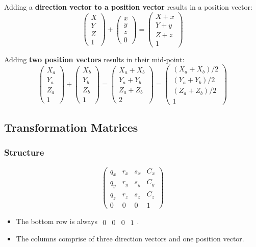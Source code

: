 \documentclass[11pt]{article}
\begin{document}
Adding a \textbf{direction vector to a position vector} results in a position vector:
\[
  \begin{pmatrix} X \\ Y \\ Z \\ 1 \end{pmatrix} 
  +
  \begin{pmatrix} x \\ y \\ z \\ 0 \end{pmatrix} 
  =
  \begin{pmatrix} X + x \\ Y + y \\ Z + z \\ 1 \end{pmatrix} 
\]

Adding \textbf{two position vectors} results in their mid-point:
\[
  \begin{pmatrix} X_a \\ Y_a \\ Z_a \\ 1 \end{pmatrix} 
  +
  \begin{pmatrix} X_b \\ Y_b \\ Z_b \\ 1 \end{pmatrix} 
  =
  \begin{pmatrix} X_a + X_b \\ Y_a + Y_b \\ Z_a + Z_b \\ 2 \end{pmatrix} 
  =
  \begin{pmatrix} (X_a + X_b) / 2 \\ (Y_a + Y_b) / 2 \\ (Z_a + Z_b) / 2 \\ 1 \end{pmatrix} 
\]

\subsection{Transformation Matrices}
\subsubsection{Structure}
\[
  \begin{pmatrix}
    q_x & r_x & s_x & C_x \\
    q_y & r_y & s_y & C_y \\
    q_z & r_z & s_z & C_z \\
    0 & 0 & 0 & 1
  \end{pmatrix}
\]
\begin{itemize}
  \item The bottom row is always $\begin{matrix}0&0&0&1\end{matrix}$.
  \item The columns comprise of three direction vectors and one position vector.
\end{itemize}
\end{document}
